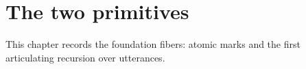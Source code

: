 \chapter{The two primitives}
\label{ch:primitives}

This chapter records the foundation fibers: atomic marks and the first
articulating recursion over utterances.





